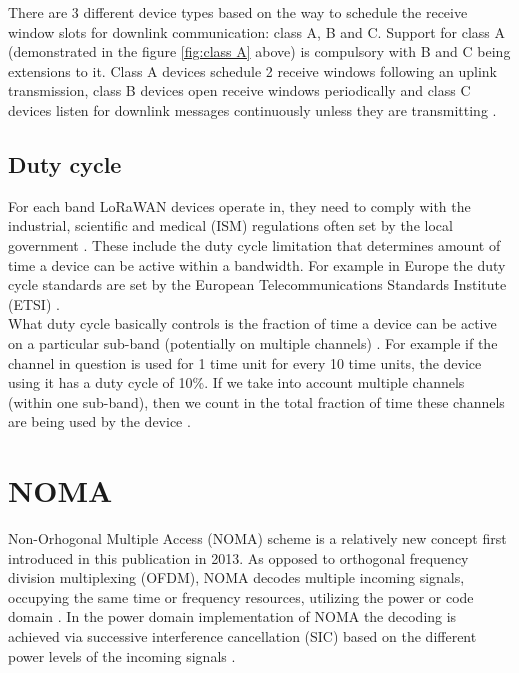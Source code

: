 There are 3 different device types based on the way to schedule the receive window slots for downlink communication: class A, B and C. Support for class A (demonstrated in the figure \ref{fig:class A} above) is compulsory with B and C being extensions to it. Class A devices schedule 2 receive windows following an uplink transmission, class B devices open receive windows periodically and class C devices listen for downlink messages continuously unless they are transmitting \cite{lora_alliance_spec}. 

\subsection{Duty cycle}
For each band LoRaWAN devices operate in, they need to comply with the industrial, scientific and medical (ISM) regulations often set by the local government \cite{duty_cycle}. These include the duty cycle limitation that determines amount of time a device can be active within a bandwidth. For example in Europe the duty cycle standards are set by the 
European Telecommunications Standards Institute (ETSI) \cite{about_etsi}.\\

What duty cycle basically controls is the fraction of time a device can be active on a particular sub-band (potentially on multiple channels) \cite{duty_cycle}. For example if the channel in 
question is used for 1 time unit for every 10 time units,
the device using it has a duty cycle of 10\%. If we take into account multiple channels (within one sub-band), then we count in the total fraction of time these channels are being used by the device \cite{duty_cycle}.

\section{NOMA}
 
 Non-Orhogonal Multiple Access (NOMA) scheme is a relatively new concept first introduced in this publication \cite{noma_original} in 2013. As opposed to orthogonal
frequency division multiplexing (OFDM), NOMA decodes multiple incoming signals, occupying the same time 
or frequency resources, utilizing the power or code domain \cite{noma_imperial}. 
In the power domain implementation of NOMA the decoding is achieved via successive interference cancellation (SIC) based on the different power levels of the incoming signals \cite{noma_imperial} \cite{noma_original}. \\

